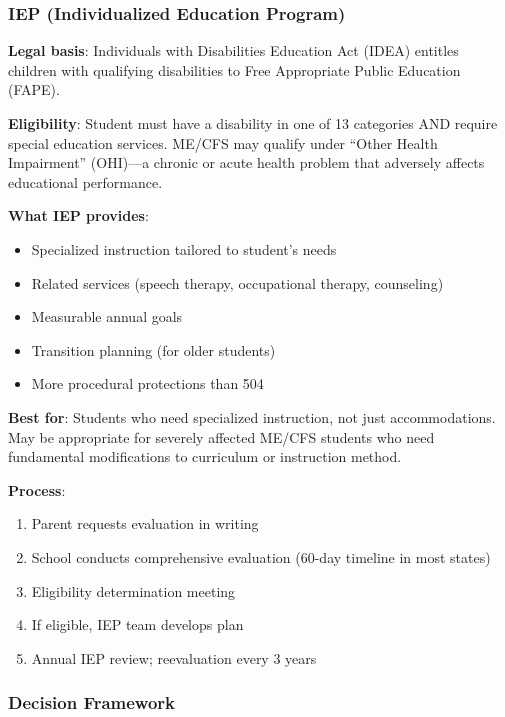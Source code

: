 \subsubsection{IEP (Individualized Education Program)}

\textbf{Legal basis}: Individuals with Disabilities Education Act (IDEA) entitles children with qualifying disabilities to Free Appropriate Public Education (FAPE).

\textbf{Eligibility}: Student must have a disability in one of 13 categories AND require special education services. ME/CFS may qualify under ``Other Health Impairment'' (OHI)---a chronic or acute health problem that adversely affects educational performance.

\textbf{What IEP provides}:
\begin{itemize}
    \item Specialized instruction tailored to student's needs
    \item Related services (speech therapy, occupational therapy, counseling)
    \item Measurable annual goals
    \item Transition planning (for older students)
    \item More procedural protections than 504
\end{itemize}

\textbf{Best for}: Students who need specialized instruction, not just accommodations. May be appropriate for severely affected ME/CFS students who need fundamental modifications to curriculum or instruction method.

\textbf{Process}:
\begin{enumerate}
    \item Parent requests evaluation in writing
    \item School conducts comprehensive evaluation (60-day timeline in most states)
    \item Eligibility determination meeting
    \item If eligible, IEP team develops plan
    \item Annual IEP review; reevaluation every 3 years
\end{enumerate}

\subsubsection{Decision Framework}

